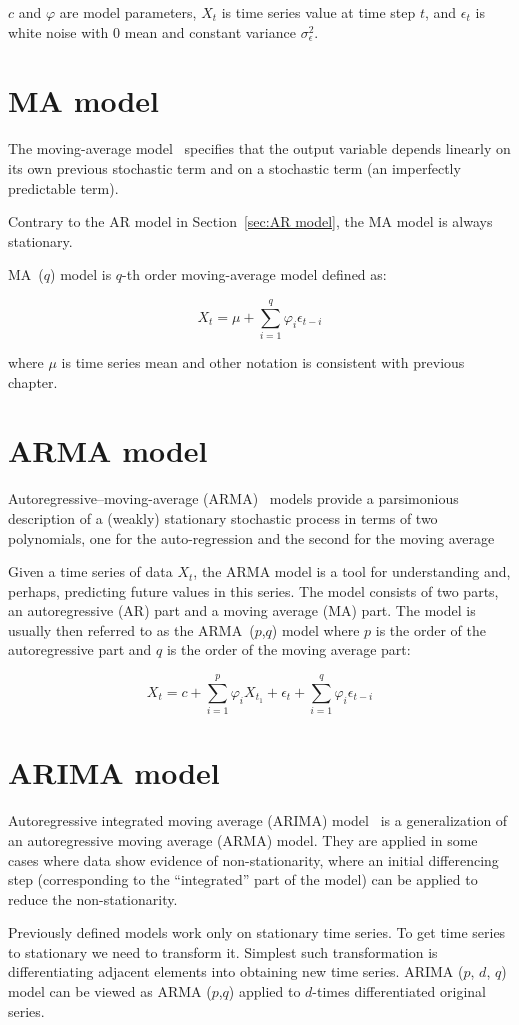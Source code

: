 $c$ and $\varphi$ are model parameters, $X_t$ is time series value at time step $t$, and $\epsilon_t$ is white noise with 0 mean and constant variance $\sigma_{\epsilon}^2$.

\section{MA model}
\label{sec:MA model}
The moving-average model~\autocite{tsa} specifies that the output variable depends linearly on its own previous stochastic term and on a stochastic term (an imperfectly predictable term).

Contrary to the AR model in Section~\ref{sec:AR model}, the MA model is always stationary.

MA~($q$) model is $q$-th order moving-average model defined as:

\begin{equation*}
  X_t = \mu + \sum_{i=1}^q{\varphi_i \epsilon_{t-i}}
\end{equation*}

where $\mu$ is time series mean and other notation is consistent with previous chapter.

\section{ARMA model}
\label{sec:ARMA model}

Autoregressive–moving-average (ARMA)~\autocite{tsa} models provide a parsimonious description of a (weakly) stationary stochastic process in terms of two polynomials, one for the auto-regression and the second for the moving average

Given a time series of data $X_t$, the ARMA model is a tool for understanding and, perhaps, predicting future values in this series. The model consists of two parts, an autoregressive (AR) part and a moving average (MA) part. The model is usually then referred to as the ARMA~($p$,$q$) model where $p$ is the order of the autoregressive part and $q$ is the order of the moving average part:

\begin{equation*}
  X_t = c + \sum_{i=1}^p{\varphi_i X_{t_1}} + \epsilon_t + \sum_{i=1}^q{\varphi_i \epsilon_{t-i}}
\end{equation*}


\section{ARIMA model}
\label{sec:ARIMA model}

Autoregressive integrated moving average (ARIMA) model~\autocite{tsa} is a generalization of an autoregressive moving average (ARMA) model. They are applied in some cases where data show evidence of non-stationarity, where an initial differencing step (corresponding to the “integrated” part of the model) can be applied to reduce the non-stationarity.

Previously defined models work only on stationary time series. To get time
series to stationary we need to transform it. Simplest such transformation is
differentiating adjacent elements into obtaining new time series. ARIMA ($p$,
$d$, $q$) model can be viewed as ARMA ($p$,$q$) applied to $d$-times differentiated original series.
